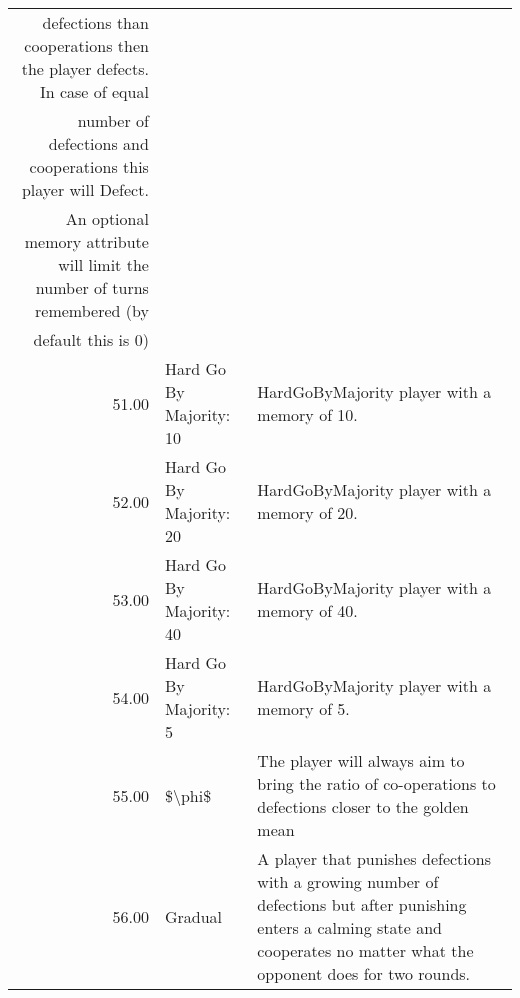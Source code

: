 \begin{tabular}{rll}
	                                       defections than cooperations then the player defects. In case of equal \\
	                                       number of defections and cooperations this player will Defect. \\
	                                      An optional memory attribute will limit the number of turns remembered (by \\
	                                      default this is 0)                                                                                                                                                                                                                                                                                                                                                                                                                                                                                                                                                                                                                                                                                             \\
	51.00  & Hard Go By Majority: 10     & HardGoByMajority player with a memory of 10.                                                                                      \\
	52.00  & Hard Go By Majority: 20     & HardGoByMajority player with a memory of 20.                                                                                      \\
	53.00  & Hard Go By Majority: 40     & HardGoByMajority player with a memory of 40.                                                                                      \\
	54.00  & Hard Go By Majority: 5      & HardGoByMajority player with a memory of 5.                                                                                       \\
	55.00  & \$\textbackslash{}phi\$     & The player will always aim to bring the ratio of co-operations to defections closer to the golden mean                            \\
	56.00  & Gradual                     & A player that punishes defections with a growing number of defections
	but after punishing enters a calming state and cooperates no matter what
	the opponent does for two rounds.


\end{tabular}
